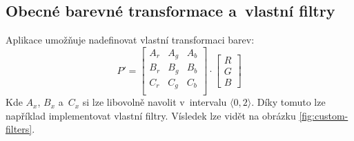 \documentclass[11pt, a4paper, titlepage]{article}
\begin{document}
\subsection{Obecné barevné transformace a~vlastní filtry}
Aplikace umožňuje nadefinovat vlastní transformaci barev:
$$
P'
=
\begin{bmatrix}
    A_r & A_g & A_b \\
    B_r & B_g & B_b \\
    C_r & C_g & C_b \\
\end{bmatrix}
\cdot
\begin{bmatrix}R\\G\\B\end{bmatrix}
$$
Kde $A_x$, $B_x$ a~$C_x$ si lze libovolně navolit v~intervalu $\langle0, 2\rangle$.
Díky tomuto lze například implementovat vlastní filtry.
Vísledek lze vidět na obrázku \ref{fig:custom-filters}.
\end{document}
